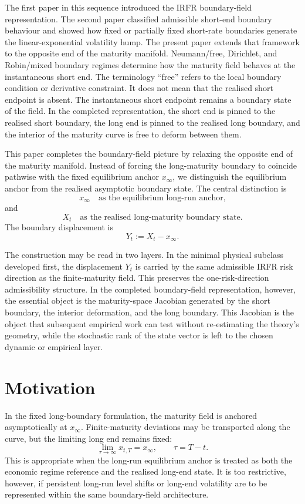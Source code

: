 \documentclass[11pt]{article}
\begin{document}
The first paper in this sequence introduced the IRFR boundary-field representation. The second paper classified admissible short-end boundary behaviour and showed how fixed or partially fixed short-rate boundaries generate the linear-exponential volatility hump. The present paper extends that framework to the opposite end of the maturity manifold. Neumann/free, Dirichlet, and Robin/mixed boundary regimes determine how the maturity field behaves at the instantaneous short end. The terminology ``free'' refers to the local boundary condition or derivative constraint. It does not mean that the realised short endpoint is absent. The instantaneous short endpoint remains a boundary state of the field. In the completed representation, the short end is pinned to the realised short boundary, the long end is pinned to the realised long boundary, and the interior of the maturity curve is free to deform between them.

This paper completes the boundary-field picture by relaxing the opposite end of the maturity manifold. Instead of forcing the long-maturity boundary to coincide pathwise with the fixed equilibrium anchor \(x_\infty\), we distinguish the equilibrium anchor from the realised asymptotic boundary state. The central distinction is
\[
x_\infty
\quad\text{as the equilibrium long-run anchor,}
\]
and
\[
X_t
\quad\text{as the realised long-maturity boundary state.}
\]
The boundary displacement is
\[
Y_t := X_t-x_\infty.
\]

The construction may be read in two layers. In the minimal physical subclass developed first, the displacement \(Y_t\) is carried by the same admissible IRFR risk direction as the finite-maturity field. This preserves the one-risk-direction admissibility structure. In the completed boundary-field representation, however, the essential object is the maturity-space Jacobian generated by the short boundary, the interior deformation, and the long boundary. This Jacobian is the object that subsequent empirical work can test without re-estimating the theory's geometry, while the stochastic rank of the state vector is left to the chosen dynamic or empirical layer.

\section{Motivation}

In the fixed long-boundary formulation, the maturity field is anchored asymptotically at \(x_\infty\). Finite-maturity deviations may be transported along the curve, but the limiting long end remains fixed:
\[
\lim_{\tau\to\infty} x_{t,T}=x_\infty,
\qquad \tau=T-t.
\]
This is appropriate when the long-run equilibrium anchor is treated as both the economic regime reference and the realised long-end state. It is too restrictive, however, if persistent long-run level shifts or long-end volatility are to be represented within the same boundary-field architecture.
\end{document}
